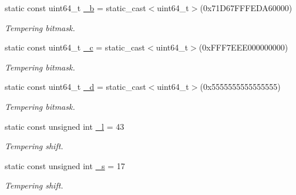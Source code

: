 \begin{DoxyCompactItemize}
static const uint64\+\_\+t \hyperlink{classvarfiles_1_1_generate_m_t_a5a90cd28215ac0b3272c1a3480bf56ce}{\+\_\+b} = static\+\_\+cast$<$uint64\+\_\+t$>$(0x71\+D67\+F\+F\+F\+E\+D\+A60000)
\begin{DoxyCompactList}\small\item\em Tempering bitmask. \end{DoxyCompactList}\item 
\mbox{\label{classvarfiles_1_1_generate_m_t_a8abca1c01d475316b80e0d7b7e23e88d}} 
static const uint64\+\_\+t \hyperlink{classvarfiles_1_1_generate_m_t_a8abca1c01d475316b80e0d7b7e23e88d}{\+\_\+c} = static\+\_\+cast$<$uint64\+\_\+t$>$(0x\+F\+F\+F7\+E\+E\+E000000000)
\begin{DoxyCompactList}\small\item\em Tempering bitmask. \end{DoxyCompactList}\item 
\mbox{\label{classvarfiles_1_1_generate_m_t_ab4c0a3714189a167cb6d0d0cf33df694}} 
static const uint64\+\_\+t \hyperlink{classvarfiles_1_1_generate_m_t_ab4c0a3714189a167cb6d0d0cf33df694}{\+\_\+d} = static\+\_\+cast$<$uint64\+\_\+t$>$(0x5555555555555555)
\begin{DoxyCompactList}\small\item\em Tempering bitmask. \end{DoxyCompactList}\item 
\mbox{\label{classvarfiles_1_1_generate_m_t_a5ab9c0985b9fd3de64316f580c2eba7d}} 
static const unsigned int \hyperlink{classvarfiles_1_1_generate_m_t_a5ab9c0985b9fd3de64316f580c2eba7d}{\+\_\+l} = 43
\begin{DoxyCompactList}\small\item\em Tempering shift. \end{DoxyCompactList}\item 
\mbox{\label{classvarfiles_1_1_generate_m_t_aaae970a607ffdb407b1bdf1e5762c92d}} 
static const unsigned int \hyperlink{classvarfiles_1_1_generate_m_t_aaae970a607ffdb407b1bdf1e5762c92d}{\+\_\+s} = 17
\begin{DoxyCompactList}\small\item\em Tempering shift. \end{DoxyCompactList}\item 

\end{DoxyCompactItemize}
